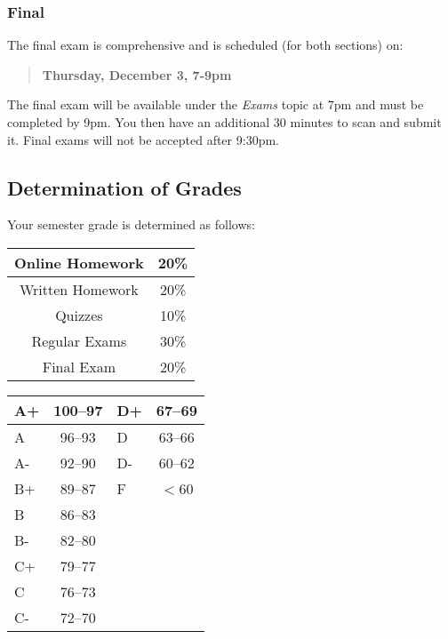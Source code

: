 \documentclass[letterpaper,12pt,fleqn]{article}
\begin{document}
\subsubsection*{Final}

The final exam is comprehensive and is scheduled (for both sections) on:

\begin{quote}
  \textbf{Thursday, December 3, 7-9pm}
\end{quote}

The final exam will be available under the \emph{Exams} topic at 7pm and must be completed by 9pm.  You then have
an additional 30 minutes to scan and submit it.  Final exams will not be accepted after 9:30pm.

\newpage

\subsection*{Determination of Grades}

Your semester grade is determined as follows:

\bigskip

\begin{center}
  \begin{minipage}{2.5in}
    \centering
    \begin{tabular}{|c|c|}
      \hline
      Online Homework & 20\% \\
      \hline
      Written Homework & 20\% \\
      \hline
      Quizzes & 10\% \\
      \hline
      Regular Exams & 30\% \\
      \hline
      Final Exam & 20\% \\
      \hline
    \end{tabular}
  \end{minipage}
  \begin{minipage}{2.5in}
    \centering
    \begin{tabular}{|l|c||l|c|}
      \hline
      A+ & 100--97 & D+ & 67--69 \\
      \hline
      A & 96--93 & D & 63--66 \\
      \hline
      A- & 92--90 & D- & 60--62 \\
      \hline
      B+ & 89--87 & F & \(<\)60 \\
      \hline
      B & 86--83 & & \\
      \hline
      B- & 82--80 & & \\
      \hline
      C+ & 79--77 & & \\
      \hline
      C & 76--73 & & \\
      \hline
      C- & 72--70 & & \\
      \hline
    \end{tabular}
  \end{minipage}
\end{center}
\end{document}
